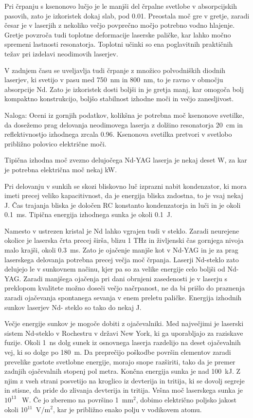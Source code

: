 Pri črpanju s ksenonovo lučjo je le manjši del črpalne svetlobe v
absorpcijskih pasovih, zato je izkoristek dokaj slab, pod 0.01. Preostala
moč gre v gretje, zaradi česar je v laserjih z nekoliko večjo povprečno
močjo potrebno vodno hlajenje. Gretje povzroča tudi toplotne deformacije
laserske paličke, kar lahko močno spremeni lastnosti resonatorja. Toplotni
učinki so ena poglavitnih praktičnih težav pri izdelavi neodimovih
laserjev.

V zadnjem času se uveljavlja tudi črpanje z množico polvodniških diodnih
laserjev, ki svetijo v pasu med 750~nm in 800~nm, to je ravno v območju
absorpcije Nd. Zato je izkoristek dosti boljši in je gretja manj, kar
omogoča bolj kompaktno konstrukcijo, boljšo stabilnost izhodne moči in
večjo zanesljivost.

Naloga: Oceni iz gornjih podatkov, kolikšna je potrebna moč ksenonove
svetilke, da dosežemo prag delovanja neodimovega laserja z dolžino
resonatorja 20~cm in reflektivnostjo izhodnega zrcala 0.96. Ksenonova
svetilka pretvori v svetlobo približno polovico električne moči.

Tipična izhodna moč zvezno delujočega Nd-YAG laserja je nekaj deset W, za
kar je potrebna električna moč nekaj kW.

Pri delovanju v sunkih se skozi bliskovno luč izprazni nabit kondenzator,
ki mora imeti precej veliko kapacitivnost, da je energija bliska zadostna,
to je vsaj nekaj J. Čas trajanja bliska je določen RC konstanto
kondenzatorja in luči in je okoli 0.1~ms. Tipična energija izhodnega sunka
je okoli 0.1~J.

Namesto v ustrezen kristal je Nd lahko vgrajen tudi v steklo. Zaradi
neurejene okolice je laserska črta precej širša, blizu 1 THz in
življenski čas gornjega nivoja malo krajši, okoli 0.3~ms. Zato je
ojačenje manjše kot v Nd-YAG in je za prag laserskega delovanja potrebna
precej večja moč črpanja. Laserji Nd-steklo zato delujejo le v sunkovnem
načinu, kjer pa so za velike energije celo boljši od Nd-YAG. Zaradi
manjšega ojačenja pri dani obrnjeni zasedenosti je v laserju s preklopom
kvalitete možno doseči večjo načrpanost, ne da bi prišlo do praznenja
zaradi ojačevanja spontanega sevanja v enem preletu paličke. Energija
izhodnih sunkov laserjev Nd- steklo so tako do nekaj J.

Večje energije sunkov je mogoče dobiti z ojačevalniki. Med največjimi je
laserski sistem Nd-steklo v Rochestru v državi New York, ki ga uporabljajo
za raziskave fuzije. Okoli 1~ns dolg sunek iz osnovnega laserja razdelijo na
deset ojačevalnih vej, ki so dolge po 180~m. Da preprečijo poškodbe
površin elementov zaradi prevelike gostote svetlobne energije, morajo snope
razširiti, tako da je premer zadnjih ojačevalnih stopenj pol metra.
Končna energija sunka je nad 100~kJ. Z njim z vseh strani posvetijo na
kroglico iz devterija in tritija, ki se dovolj segreje in stisne, da pride
do zlivanja devterija in tritija. Vršna moč laserskega sunka je $10^{13}$%
~W. Če jo zberemo na površino 1~mm$^2$, dobimo električno poljsko jakost
okoli 10$^{11}$~V/m$^2$, kar je približno enako polju v vodikovem atomu.


